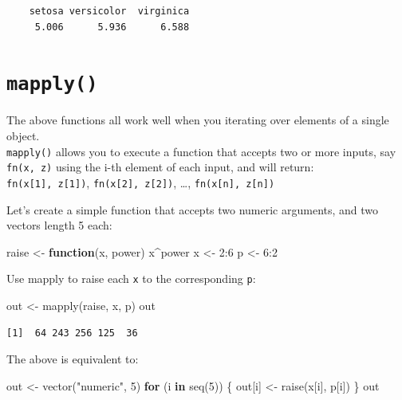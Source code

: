 \documentclass[
]{book}
\newenvironment{Shaded}{\begin{snugshade}}{\end{snugshade}}
\newcommand{\ControlFlowTok}[1]{\textcolor[rgb]{0.13,0.29,0.53}{\textbf{#1}}}
\newcommand{\DecValTok}[1]{\textcolor[rgb]{0.00,0.00,0.81}{#1}}
\newcommand{\FunctionTok}[1]{\textcolor[rgb]{0.00,0.00,0.00}{#1}}
\newcommand{\NormalTok}[1]{#1}
\newcommand{\OtherTok}[1]{\textcolor[rgb]{0.56,0.35,0.01}{#1}}
\newcommand{\SpecialCharTok}[1]{\textcolor[rgb]{0.00,0.00,0.00}{#1}}
\newcommand{\StringTok}[1]{\textcolor[rgb]{0.31,0.60,0.02}{#1}}
\begin{document}
\begin{verbatim}
    setosa versicolor  virginica 
     5.006      5.936      6.588 
\end{verbatim}

\hypertarget{mapply}{%
\section{\texorpdfstring{\texttt{mapply()}}{mapply()}}\label{mapply}}

The above functions all work well when you iterating over elements of a single object.\\
\texttt{mapply()} allows you to execute a function that accepts two or more inputs, say \texttt{fn(x,\ z)} using the i-th element of each input, and will return:\\
\texttt{fn(x{[}1{]},\ z{[}1{]})}, \texttt{fn(x{[}2{]},\ z{[}2{]})}, \ldots, \texttt{fn(x{[}n{]},\ z{[}n{]})}

Let's create a simple function that accepts two numeric arguments, and two vectors length 5 each:

\begin{Shaded}
\begin{Highlighting}[]
\NormalTok{raise }\OtherTok{\textless{}{-}} \ControlFlowTok{function}\NormalTok{(x, power) x}\SpecialCharTok{\^{}}\NormalTok{power}
\NormalTok{x }\OtherTok{\textless{}{-}} \DecValTok{2}\SpecialCharTok{:}\DecValTok{6}
\NormalTok{p }\OtherTok{\textless{}{-}} \DecValTok{6}\SpecialCharTok{:}\DecValTok{2}
\end{Highlighting}
\end{Shaded}

Use mapply to raise each \texttt{x} to the corresponding \texttt{p}:

\begin{Shaded}
\begin{Highlighting}[]
\NormalTok{out }\OtherTok{\textless{}{-}} \FunctionTok{mapply}\NormalTok{(raise, x, p)}
\NormalTok{out}
\end{Highlighting}
\end{Shaded}

\begin{verbatim}
[1]  64 243 256 125  36
\end{verbatim}

The above is equivalent to:

\begin{Shaded}
\begin{Highlighting}[]
\NormalTok{out }\OtherTok{\textless{}{-}} \FunctionTok{vector}\NormalTok{(}\StringTok{"numeric"}\NormalTok{, }\DecValTok{5}\NormalTok{)}
\ControlFlowTok{for}\NormalTok{ (i }\ControlFlowTok{in} \FunctionTok{seq}\NormalTok{(}\DecValTok{5}\NormalTok{)) \{}
\NormalTok{  out[i] }\OtherTok{\textless{}{-}} \FunctionTok{raise}\NormalTok{(x[i], p[i])}
\NormalTok{\}}
\NormalTok{out}
\end{Highlighting}
\end{Shaded}
\end{document}
